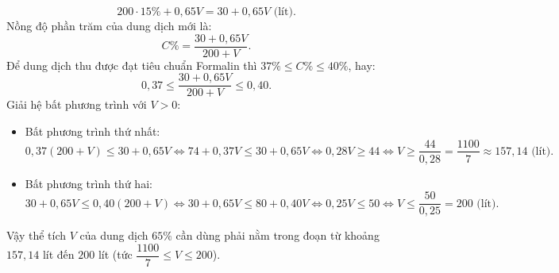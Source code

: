 \begin{bt}
{\begin{enumerate}[a)]
	$$ 200 \cdot 15\% + 0{,}65V = 30 + 0{,}65V\text{ (lít)}. $$
	Nồng độ phần trăm của dung dịch mới là:
	$$ C\% = \dfrac{30 + 0{,}65V}{200 + V}. $$
	Để dung dịch thu được đạt tiêu chuẩn Formalin thì $37\% \le C\% \le 40\%$, hay:
	$$ 0{,}37 \le \dfrac{30 + 0{,}65V}{200 + V} \le 0{,}40. $$
	Giải hệ bất phương trình với $V > 0$:
	\begin{itemize}
		\item Bất phương trình thứ nhất:
		$$ 0{,}37(200 + V) \le 30 + 0{,}65V \iff 74 + 0{,}37V \le 30 + 0{,}65V \iff 0{,}28V \ge 44 \iff V \ge \dfrac{44}{0{,}28} = \dfrac{1100}{7} \approx 157{,}14\text{ (lít)}. $$
		\item Bất phương trình thứ hai:
		$$ 30 + 0{,}65V \le 0{,}40(200 + V) \iff 30 + 0{,}65V \le 80 + 0{,}40V \iff 0{,}25V \le 50 \iff V \le \dfrac{50}{0{,}25} = 200\text{ (lít)}. $$
	\end{itemize}
	Vậy thể tích $V$ của dung dịch $65\%$ cần dùng phải nằm trong đoạn từ khoảng $157{,}14$ lít đến $200$ lít (tức $\dfrac{1100}{7} \le V \le 200$).
\end{enumerate}
}
\end{bt}

